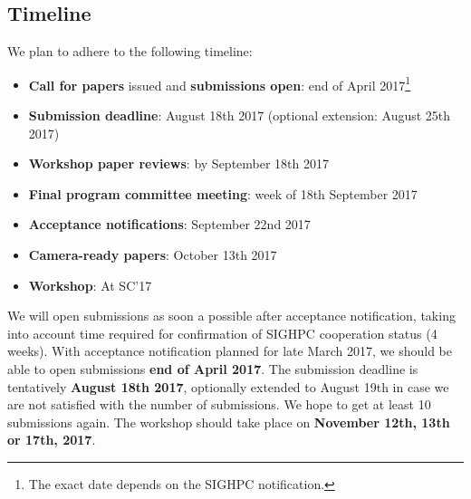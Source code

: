 \documentclass[a4paper,10pt]{article}
\begin{document}
\subsection*{Timeline}
\label{timeline}

We plan to adhere to the following timeline:

\begin{itemize}
    \item \textbf{Call for papers} issued and \textbf{submissions open}: end of April 2017\footnote{The exact date depends on the SIGHPC notification.}
    \item \textbf{Submission deadline}: August 18th 2017 (optional extension: August 25th 2017)
    \item \textbf{Workshop paper reviews}: by September 18th 2017
    \item \textbf{Final program committee meeting}: week of 18th September 2017
    \item \textbf{Acceptance notifications}: September 22nd 2017
    \item \textbf{Camera-ready papers}: October 13th 2017
    \item \textbf{Workshop}: At SC'17
\end{itemize}
\noindent
We will open submissions as soon a possible after acceptance notification, taking into account time required for confirmation of SIGHPC cooperation status (4 weeks). With acceptance notification planned for late March 2017, we should be able to open submissions \textbf{end of April 2017}.
%
The submission deadline is tentatively \textbf{August 18th 2017}, optionally extended to August 19th in case
we are not satisfied with the number of submissions. We hope to get at least 10 submissions again.
%
%
%
The workshop should take place on \textbf{November 12th, 13th or 17th, 2017}.
\end{document}
